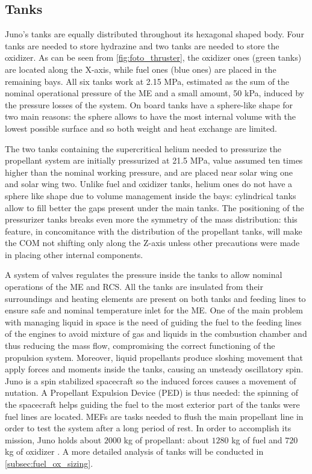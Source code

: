 \pagebreak
\subsection{Tanks} 
\label{subsec:tanks}

Juno's tanks are equally distributed throughout its hexagonal shaped body. Four tanks are needed to store hydrazine and two tanks are needed to store the oxidizer. As can be seen from \autoref{fig:foto_thruster}, the oxidizer ones (green tanks) are located along the X-axis, while fuel ones (blue ones) are placed in the remaining bays. All six tanks work at 2.15 MPa, estimated as the sum of the nominal operational pressure of the ME and a small amount, 50 kPa, induced by the pressure losses of the system\cite{Leros}. On board tanks have a sphere-like shape for two main reasons: the sphere allows to have the most internal volume with the lowest possible surface and so both weight and heat exchange are limited.

The two tanks\cite{2tankshe} containing the supercritical helium needed to pressurize the propellant system are initially pressurized at 21.5 MPa, value assumed ten times higher than the nominal working pressure, and are placed near solar wing one and solar wing two. Unlike fuel and oxidizer tanks, helium ones do not have a sphere like shape due to volume management inside the bays\cite{he_tank}: cylindrical tanks allow to fill better the gaps present under the main tanks. The positioning of the pressurizer tanks breaks even more the symmetry of the mass distribution: this feature, in concomitance with the distribution of the propellant tanks, will make the COM not shifting only along the Z-axis unless other precautions were made in placing other internal components. 

A system of valves regulates the pressure inside the tanks to allow nominal operations of the ME and RCS. All the tanks are insulated from their surroundings and heating elements are present on both tanks and feeding lines to ensure safe and nominal temperature inlet for the ME\cite{Leros}.
One of the main problem with managing liquid in space is the need of guiding the fuel to the feeding lines of the engines to avoid mixture of gas and liquids in the combustion chamber and thus reducing the mass flow, compromising the correct functioning of the propulsion system. Moreover, liquid propellants produce sloshing movement that apply forces and moments inside the tanks, causing an unsteady oscillatory spin. Juno is a spin stabilized spacecraft so the induced forces causes a movement of nutation. A Propellant Expulsion Device (PED) is thus needed: the spinning of the spacecraft helps guiding the fuel to the most exterior part of the tanks were fuel lines are located\cite{slosh}.
MEFs are tasks needed to flush the main propellant line in order to test the system after a long period of rest.
In order to accomplish its mission, Juno holds about $2000$ kg of propellant: about $1280$ kg of fuel and $720$ kg of oxidizer \cite{juno_inner}. A more detailed analysis of tanks will be conducted in \autoref{subsec:fuel_ox_sizing}.